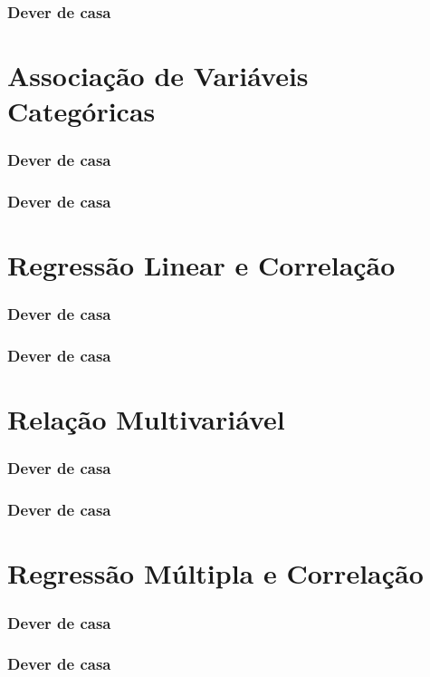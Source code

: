 \documentclass[graphics,14pt]{beamer}
\begin{document}
\begin{frame}[t,fragile=singleslide]
\frametitle{Dever de casa}
\end{frame}
\section{Associação de Variáveis Categóricas}
\begin{frame}[t,fragile=singleslide]
\frametitle{Dever de casa}
\end{frame}
\begin{frame}[t,fragile=singleslide]
\frametitle{Dever de casa}
\end{frame}
\section{Regressão Linear e Correlação}
\begin{frame}[t,fragile=singleslide]
\frametitle{Dever de casa}
\end{frame}
\begin{frame}[t,fragile=singleslide]
\frametitle{Dever de casa}
\end{frame}
\section{Relação Multivariável}
\begin{frame}[t,fragile=singleslide]
\frametitle{Dever de casa}
\end{frame}
\begin{frame}[t,fragile=singleslide]
\frametitle{Dever de casa}
\end{frame}
\section{Regressão Múltipla e Correlação}
\begin{frame}[t,fragile=singleslide]
\frametitle{Dever de casa}
\end{frame}
\begin{frame}[t,fragile=singleslide]
\frametitle{Dever de casa}
\end{frame}
\end{document}
